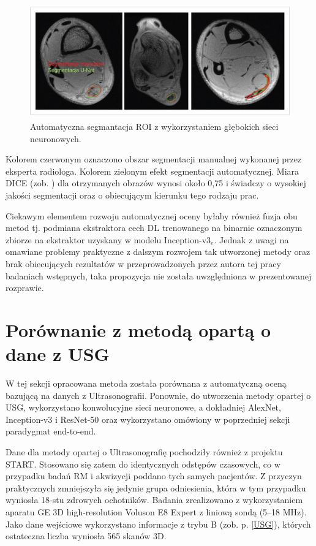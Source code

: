 \begin{figure}[h]
	\centering
	\includegraphics[width=1\textwidth]{figures/Segmentacja.jpg}
	\caption{Automatyczna segmantacja ROI z wykorzystaniem głębokich sieci neuronowych.}\label{fig:segmentacja}
\end{figure}
Kolorem czerwonym oznaczono obszar segmentacji manualnej wykonanej przez eksperta radiologa. Kolorem zielonym efekt segmentacji automatycznej. Miara DICE (zob. \cite{Zou2004}) dla otrzymanych obrazów wynosi około 0,75 i świadczy o wysokiej jakości segmentacji oraz o obiecującym kierunku tego rodzaju prac.

Ciekawym elementem rozwoju automatycznej oceny byłaby również fuzja obu metod tj. podmiana ekstraktora cech DL trenowanego na binarnie oznaczonym zbiorze na ekstraktor uzyskany w modelu Inception-v3$_e$. Jednak z uwagi na omawiane problemy praktyczne z dalszym rozwojem tak utworzonej metody oraz brak obiecujących rezultatów w przeprowadzonych przez autora tej pracy badaniach wstępnych, taka propozycja nie została uwzględniona w prezentowanej rozprawie. 

\section{Porównanie z metodą opartą o dane z USG}
\label{seq:comp-usg}
W tej sekcji opracowana metoda została porównana z automatyczną oceną bazującą na danych z Ultrasonografii. Ponownie, do utworzenia metody opartej o USG, wykorzystano konwolucyjne sieci neuronowe, a dokładniej AlexNet, Inception-v3 i ResNet-50 oraz wykorzystano omówiony w poprzedniej sekcji paradygmat end-to-end. 

Dane dla metody opartej o Ultrasonografię pochodziły również z projektu START. Stosowano się zatem do identycznych odstępów czasowych, co w przypadku badań RM i akwizycji poddano tych samych pacjentów. Z przyczyn praktycznych zmniejszyła się jedynie grupa odniesienia, która w tym przypadku wyniosła 18-stu zdrowych ochotników. Badania zrealizowano z wykorzystaniem aparatu GE 3D high-resolution Voluson E8 Expert z liniową sondą (5--18 MHz). Jako dane wejściowe wykorzystano informacje z trybu B (zob. p. \ref{USG}), których ostateczna liczba wyniosła 565 skanów 3D. 


